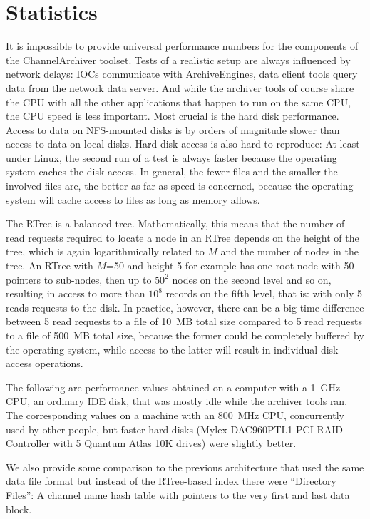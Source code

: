 \section{Statistics} \label{sec:perfstats}
It is impossible to provide universal performance numbers for the
components of the ChannelArchiver toolset. Tests of a realistic setup
are always influenced by network delays: IOCs communicate with ArchiveEngines,
data client tools query data from the network data server.
And while the archiver tools of course share the CPU with all the
other applications that happen to run on the same CPU,
the CPU speed is less important. Most crucial is the hard
disk performance. Access to data on NFS-mounted disks is by orders of
magnitude slower than access to data on local disks.
Hard disk access is also hard to reproduce: At least under Linux, the second
run of a test is always faster because the operating system caches the
disk access. In general, the fewer files and the smaller the involved
files are, the better as far as speed is concerned, because the
operating system will cache access to files as long as memory allows.

The RTree is a balanced tree. Mathematically, this means that the
number of read requests required to locate a node in an RTree depends
on the height of the tree, which is again logarithmically related to
$M$ and the number of nodes in the tree.  An RTree with $M$=50 and
height 5 for example has one root node with 50 pointers to sub-nodes,
then up to $50^2$ nodes on the second level and so on, resulting in
access to more than $10^{8}$ records on the fifth level, that is:
with only 5 reads requests to the disk.
In practice, however, there can be a big time difference between 5
read requests to a file of 10~MB total size compared to 5 read
requests to a file of 500~MB total size, because the former could be
completely buffered by the operating system, while access to the
latter will result in individual disk access operations.

The following are performance values obtained on a computer
with a 1~GHz CPU, an ordinary IDE disk, that was mostly idle
while the archiver tools ran. %
The corresponding values on a machine with an 800~MHz CPU, concurrently
used by other people, but faster hard disks (Mylex
DAC960PTL1 PCI RAID Controller with 5 Quantum Atlas 10K drives) were
slightly better. %

We also provide some comparison to the previous architecture that used
the same data file format but instead of the RTree-based index there
were ``Directory Files'': A channel name hash table with pointers to
the very first and last data block.

